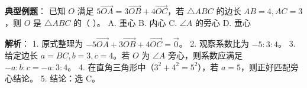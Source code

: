 \begin{examplebox}
\textbf{典型例题}：
已知 $O$ 满足 $5\vec{OA} = 3\vec{OB} + 4\vec{OC}$，若 $\triangle ABC$ 的边长 $AB=4, AC=3$，则 $O$ 是 $\triangle ABC$ 的（ \quad ）。
A. 重心 \quad B. 内心 \quad C. $\angle A$ 的旁心 \quad D. 垂心

\textbf{解析}：
1. 原式整理为 $-5\vec{OA} + 3\vec{OB} + 4\vec{OC} = \vec{0}$。
2. 观察系数比为 $-5:3:4$。
3. 给定边长 $a=BC, b=3, c=4$。若 $O$ 为 $\angle A$ 旁心，则系数应满足 $-a:b:c = -a:3:4$。
4. 在直角三角形中（$3^2+4^2=5^2$），若 $a=5$，则正好匹配旁心结论。
5. 结论：选 C。
\end{examplebox}